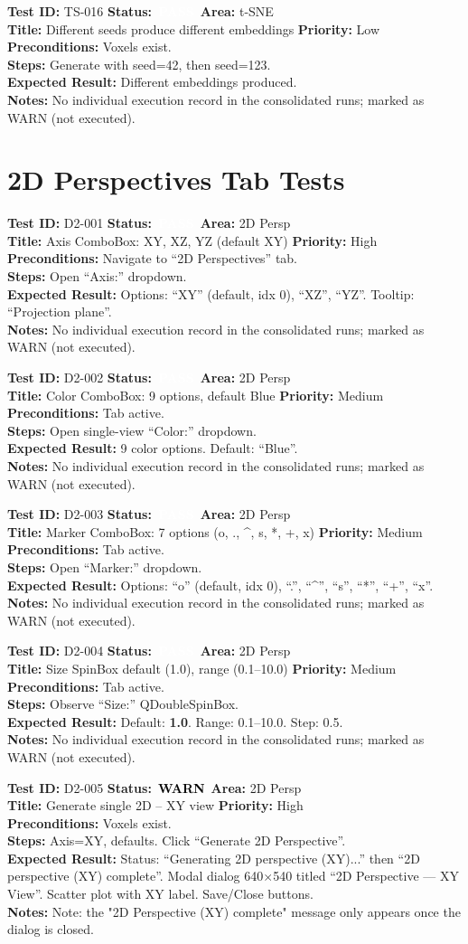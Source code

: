 \documentclass[12pt,a4paper]{article}
\newcommand{\statuspass}{\colorbox{statusgreen}{\textcolor{white}{\textbf{\,PASS\,}}}}
\newcommand{\statuswarn}{\colorbox{statusyellow}{\textcolor{black}{\textbf{\,WARN\,}}}}
\newcommand{\testcase}[9]{%
  \smallskip
  \noindent\textbf{Test ID:} #1 \hfill \textbf{Status:} #2 \hfill \textbf{Area:} #3 \\
  \textbf{Title:} #4 \hfill \textbf{Priority:} #5 \\[0.3em]
  \textbf{Preconditions:} #6 \\[0.3em]
  \textbf{Steps:} #7 \\[0.3em]
  \textbf{Expected Result:} #8 \\
  \textbf{Notes:} #9
  \smallskip
}
\begin{document}
\testcase{TS-016}{\statuspass}{t-SNE}{Different seeds produce different embeddings}{Low}{Voxels exist.}{Generate with seed=42, then seed=123.}{Different embeddings produced.}{No individual execution record in the consolidated runs; marked as WARN (not executed).}



\section{2D Perspectives Tab Tests}

\testcase{D2-001}{\statuspass}{2D Persp}{Axis ComboBox: XY, XZ, YZ (default XY)}{High}{Navigate to ``2D Perspectives'' tab.}{Open ``Axis:'' dropdown.}{Options: ``XY'' (default, idx 0), ``XZ'', ``YZ''. Tooltip: ``Projection plane''.}{No individual execution record in the consolidated runs; marked as WARN (not executed).}


\testcase{D2-002}{\statuspass}{2D Persp}{Color ComboBox: 9 options, default Blue}{Medium}{Tab active.}{Open single-view ``Color:'' dropdown.}{9 color options. Default: ``Blue''.}{No individual execution record in the consolidated runs; marked as WARN (not executed).}


\testcase{D2-003}{\statuspass}{2D Persp}{Marker ComboBox: 7 options (o, ., \textasciicircum, s, *, +, x)}{Medium}{Tab active.}{Open ``Marker:'' dropdown.}{Options: ``o'' (default, idx 0), ``.'', ``\textasciicircum'', ``s'', ``*'', ``+'', ``x''.}{No individual execution record in the consolidated runs; marked as WARN (not executed).}


\testcase{D2-004}{\statuspass}{2D Persp}{Size SpinBox default (1.0), range (0.1--10.0)}{Medium}{Tab active.}{Observe ``Size:'' QDoubleSpinBox.}{Default: \textbf{1.0}. Range: 0.1--10.0. Step: 0.5.}{No individual execution record in the consolidated runs; marked as WARN (not executed).}


\testcase{D2-005}{\statuswarn}{2D Persp}{Generate single 2D -- XY view}{High}{Voxels exist.}{Axis=XY, defaults. Click ``Generate 2D Perspective''.}{Status: ``Generating 2D perspective (XY)...'' then ``2D perspective (XY) complete''. Modal dialog 640$\times$540 titled ``2D Perspective --- XY View''. Scatter plot with XY label. Save/Close buttons.}{Note: the "2D Perspective (XY) complete" message only appears once the dialog is closed.}
\end{document}
